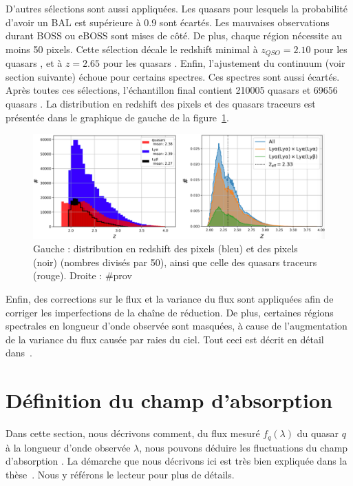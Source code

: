 \documentclass[11pt, twoside, a4paper, openright]{report}
\begin{document}
D'autres sélections sont aussi appliquées. Les quasars pour lesquels la probabilité d'avoir un BAL est supérieure à 0.9 sont écartés. Les mauvaises observations durant BOSS ou eBOSS sont mises de côté. De plus, chaque région nécessite au moins 50 pixels. Cette sélection décale le redshift minimal à $z_{QSO} = 2.10$ pour les quasars \lya{}, et à $z = 2.65$ pour les quasars \lyb{}. Enfin, l'ajustement du continuum (voir section suivante) échoue pour certains spectres. Ces spectres sont aussi écartés.
Après toutes ces sélections, l'échantillon final contient \num{210005} quasars \lya{} et \num{69656} quasars \lyb{}.
La distribution en redshift des pixels et des quasars traceurs est présentée dans le graphique de gauche de la figure~\ref{fig:pixel_number}.
\begin{figure}
  \centering
  \includegraphics[scale=0.4]{pixel_number}
  \caption{Gauche : distribution en redshift des pixels \lyalya{} (bleu) et des pixels\lyalyb{} (noir) (nombres divisés par 50), ainsi que celle des quasars traceurs (rouge). Droite : \#prov}
  \label{fig:pixel_number}
\end{figure}

Enfin, des corrections sur le flux et la variance du flux sont appliquées afin de corriger les imperfections de la chaîne de réduction. De plus, certaines régions spectrales en longueur d'onde observée sont masquées, à cause de l'augmentation de la variance du flux causée par raies du ciel. Tout ceci est décrit en détail dans~\cite{CITE:dr16}.

\section{Définition du champ d'absorption}
Dans cette section, nous décrivons comment, du flux mesuré $f_q(\lambda)$ du quasar $q$ à la longueur d'onde observée $\lambda$, nous pouvons déduire les fluctuations du champ d'absorption \lya{}.
La démarche que nous décrivons ici est très bien expliquée dans la thèse~\cite{CITE:Victoria}. Nous y référons le lecteur pour plus de détails.
\end{document}
